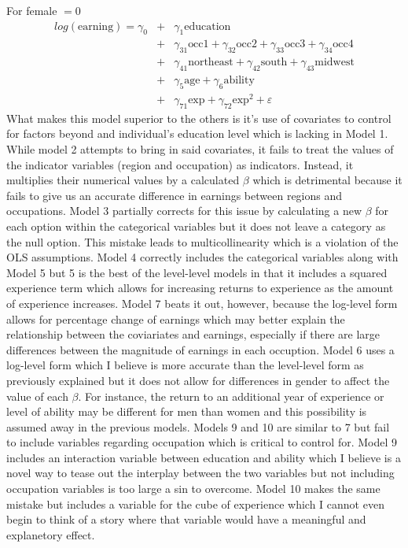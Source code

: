 \documentclass[11pt]{SelfArxOneColBMN}
\begin{document}
\indent \indent For female $= 0$
\begin{eqnarray*}
  log(\text{earning}) = \gamma_0 &+& \gamma_1\text{education}\\
  &+& \gamma_{31}\text{occ1} + \gamma_{32}\text{occ2} + \gamma_{33}\text{occ3} + \gamma_{34}\text{occ4}\\ 
  &+& \gamma_{41}\text{northeast} + \gamma_{42}\text{south} + \gamma_{43}\text{midwest}\\
  &+& \gamma_{5}\text{age} + \gamma_{6}\text{ability}\\
  &+& \gamma_{71}\text{exp} + \gamma_{72}\text{exp}^2 + \varepsilon
\end{eqnarray*}
\noindent What makes this model superior to the others is it's use of covariates to control for factors beyond and individual's education level which is lacking in Model 1. While model 2 attempts to bring in said covariates, it fails to treat the values of the indicator variables (region and occupation) as indicators. Instead, it multiplies their numerical values by a calculated $\beta$ which is detrimental because it fails to give us an accurate difference in earnings between regions and occupations. Model 3 partially corrects for this issue by calculating a new $\beta$ for each option within the categorical variables but it does not leave a category as the null option. This mistake leads to multicollinearity which is a violation of the OLS assumptions. Model 4 correctly includes the categorical variables along with Model 5 but 5 is the best of the level-level models in that it includes a squared experience term which allows for increasing returns to experience as the amount of experience increases. Model 7 beats it out, however, because the log-level form allows for percentage change of earnings which may better explain the relationship between the coviariates and earnings, especially if there are large differences between the magnitude of earnings in each occuption. Model 6 uses a log-level form which I believe is more accurate than the level-level form as previously explained but it does not allow for differences in gender to affect the value of each $\beta$. For instance, the return to an additional year of experience or level of ability may be different for men than women and this possibility is assumed away in the previous models. Models 9 and 10 are similar to 7 but fail to include variables regarding occupation which is critical to control for. Model 9 includes an interaction variable between education and ability which I believe is a novel way to tease out the interplay between the two variables but not including occupation variables is too large a sin to overcome. Model 10 makes the same mistake but includes a variable for the cube of experience which I cannot even begin to think of a story where that variable would have a meaningful and explanetory effect.\\
\end{document}

